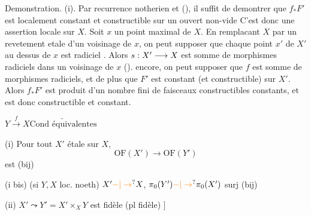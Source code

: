 D\handwritten{\'}emonstration. (i). Par r\handwritten{\'}ecurrence noth\handwritten{\'}erien et (), il suffit de d\handwritten{\'}emontrer que $f_{*}F'$ est localement constant et constructible sur un ouvert non-vide  C'est donc une assertion locale sur $X$. Soit  $x$ un point maximal de $X$. En rempla\handwritten{\c}cant $X$ par un rev\handwritten{\^}etement \handwritten{\'}etale d'un voisinage de $x$, on peut supposer que chaque point $x'$ de $X'$ au dessus de $x$ est radiciel .  Alors $s:X'\longrightarrow X$ est somme de morphismes radiciels dans un voisinage de $x$ ().    encore, on peut supposer que $f$ est somme de morphismes radiciels, et de plus que $F'$ est constant (et constructible) sur $X'$. Alors $f_{*}F'$ est produit d'un nombre fini de faisceaux constructibles constants, et est donc constructible et constant.


$Y\xrightarrow{f}X$\qquad $\underrightarrow{\text{Cond équivalentes}}$

(i) Pour tout $X'$ étale sur $X$,
\[
\mathrm{OF}(X')\longrightarrow\mathrm{OF}(Y')
\]
est  (bij)

(i bis) (si $Y,X$ loc. noeth) $X'\unsure{-|\to}X$, $\pi_0(Y')\unsure{-|\to}\pi_0(X')$ surj (bij)

(ii) $X'\leadsto Y'=X'\times_X Y$ est fidèle (pl fidèle) $\big]$ 

